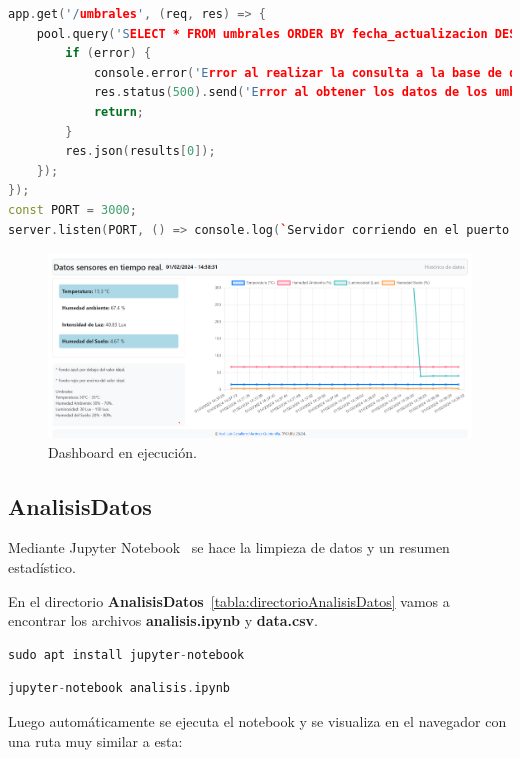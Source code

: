 \begin{lstlisting}[language=cpp, firstnumber=0, basicstyle=\normalsize, caption={Contenido de \textbf{servers.js}.}]
app.get('/umbrales', (req, res) => {
    pool.query('SELECT * FROM umbrales ORDER BY fecha_actualizacion DESC LIMIT 1', (error, results, fields) => {
        if (error) {
            console.error('Error al realizar la consulta a la base de datos:', error);
            res.status(500).send('Error al obtener los datos de los umbrales');
            return;
        }
        res.json(results[0]);
    });
});
const PORT = 3000;
server.listen(PORT, () => console.log(`Servidor corriendo en el puerto ${PORT}`));
\end{lstlisting}

\begin{figure}[h]
\centering
\includegraphics[width=1\textwidth]{img/desarrollo/Dashboard2.png}
\caption{Dashboard en ejecución.}
\end{figure}

\subsection{AnalisisDatos}
Mediante Jupyter Notebook~\cite{misc:Jupyter_Notebook} se hace la limpieza de datos y un resumen estadístico.

En el directorio \textbf{AnalisisDatos}~\ref{tabla:directorioAnalisisDatos} vamos a encontrar los archivos \textbf{analisis.ipynb} y \textbf{data.csv}.

\begin{lstlisting}[language=cpp, firstnumber=0, basicstyle=\normalsize, caption={Instalación de Jupyter Notebook.}] 
sudo apt install jupyter-notebook
\end{lstlisting}

\begin{lstlisting}[language=cpp, firstnumber=0, basicstyle=\normalsize, caption={Ejecución de \textbf{analisis.ipynb}.}] 
jupyter-notebook analisis.ipynb
\end{lstlisting}

Luego automáticamente se ejecuta el notebook y se visualiza en el navegador con una ruta muy similar a esta:

